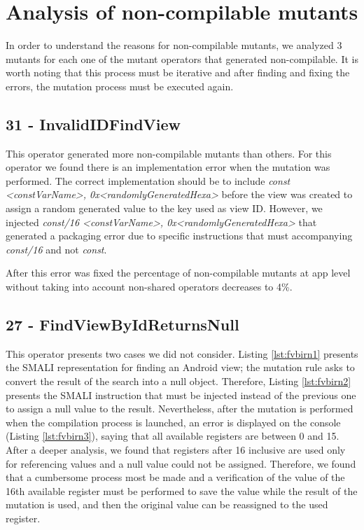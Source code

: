 \section{Analysis of non-compilable mutants}

In order to understand the reasons for non-compilable mutants, we analyzed 3 mutants for each one of the mutant operators that generated non-compilable. It is worth noting that this process must be iterative and after finding and fixing the errors, the mutation process must be executed again.

\subsection{31 - InvalidIDFindView}

This operator generated more non-compilable mutants than others. For this operator we found there is an implementation error when the mutation was performed. The correct implementation should be to include \textit{const <constVarName>, 0x<randomlyGeneratedHexa>} before the view was created to assign a random generated value to the key used as view ID. However, we injected \textit{const/16 <constVarName>, 0x<randomlyGeneratedHexa>} that generated a packaging error due to specific instructions that must accompanying \textit{const/16} and not \textit{const}.

After this error was fixed the percentage of non-compilable mutants at app level without taking into account non-shared operators decreases to 4\%.

\subsection{27 - FindViewByIdReturnsNull}

This operator presents two cases we did not consider. Listing \ref{lst:fvbirn1} presents the SMALI representation for finding an Android view; the mutation rule asks to convert the result of the search into a null object. Therefore, Listing \ref{lst:fvbirn2} presents the  SMALI instruction that must be injected instead of the previous one to assign a null value to the result. Nevertheless, after the mutation is performed when the compilation process is launched, an error is displayed on the console (Listing \ref{lst:fvbirn3}), saying that all available registers are between 0 and 15. After a deeper analysis, we found that registers after 16 inclusive are used only for referencing values and a null value could not be assigned. Therefore, we found that a cumbersome process most be made and a verification of the value of the 16th available register must be performed to save the value while the result of the mutation is used, and then the original value can be reassigned to the used register.

